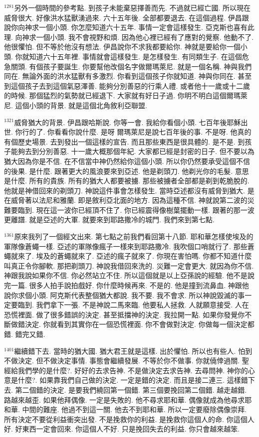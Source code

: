 \documentclass{book}
\begin{document}
$^{1281}$另外一個時間的參考點.
到孩子未能棄惡擇善而先.
不過就已經亡國.
所以現在威脅很大.
好像洪水猛獸湧過來.
六十五年後.
全部都要退去.
在這個過程.
伊昌跟說你向神求一個小頭.
你怎麼知道六十五年.
事情一定會這樣發生.
亞克斯也喜有此理.
向神求一個小頭.
我不會視野和煩.
因為他心裡已經有了應對的覺察.
他動不了.
他很懼怕.
但不等於他沒有想法.
伊昌說你不求我都要給你.
神就是要給你一個小頭.
你就知道六十五年裡.
事情就會這樣發生.
是怎樣發生.
有同類生子.
在這個危急關頭.
有個孩子要誕生.
你要幫他改個名字做爾瑪萊尼.
就是一個名稱.
神與我們同在.
無論外面的洪水猛獸有多激烈.
你看到這個孩子你就知道.
神與你同在.
甚至到這個孩子去到這個氣惡澤善.
能夠分別善惡的行乘人禮.
或者他十一歲或十二歲的時候.
那個猛烈的氣勢就已經退下.
大家就有好日子過.
你明不明白這個爾瑪萊尼.
這個小頭的背景.
就是這個北角敘利亞聯盟.

$^{1321}$威脅猶大的背景.
伊昌跟哈斯說.
你等一會.
我給你看個小頭.
七百年後耶穌出世.
你行的了.
你看看你說什麼.
是呀 爾瑪萊尼是說七百年後的事.
不是呀.
他真的有個歷史場景.
去到發出一個這樣的宣告.
而且那些東西是很具體的.
是不是.
到孩子能夠去到分別善惡.
十一歲大概那個年紀.
大家都已經是封密的日子.
但不要以為猶大因為你是不信.
在不信當中神仍然給你這個小頭.
所以你仍然要承受這個不信的後果.
是什麼.
跟著更大的風浪要來到亞述.
他是剃頭刀.
他剃光你的毛髮.
意思是什麼.
所有的貴族.
所有的猶大人都要被擄.
那些被擄者全部都是剃到乾脆脫的.
他就是神借回來的剃頭刀.
神說這件事會怎樣發生.
當時亞述都沒有威脅到猶大.
是在威脅著以法尼和雅蘭.
即是敘利亞北面的地方.
因為這種不信.
神就說第二波的災難要臨到.
現在這一波你已經頂不住了.
你已經震得像樹葉擺動一樣.
跟著的那一波更離譜.
就是亞述的大軍.
就要來到耶路撒冷的城門.
我們來到第七點.

$^{1361}$原來我列了一個經文出來.
第七點之前我們看回第十八節.
耶和華怎樣使埃及的軍隊像蒼蠅一樣.
亞述的軍隊像瘋子一樣來到耶路撒冷.
我吹個口哨就行了.
那些蒼蠅就來了.
埃及的蒼蠅就來了.
亞述的瘋子就來了.
你現在害怕嗎.
你都不知道什麼叫真正令你腳軟.
那把剃頭刀.
神說我借回來洗的.
災難一定會更大.
就因為你不信.
神跟我說如果你不信.
你必然站立不住.
所以這個就是以上亞孫說的經驗.
他不是說完一篇.
很多人拍手說拍戲好.
你什麼時候再來.
不是的.
他是撞到流鼻血.
神跟他說你求個小頭.
阿克斯代表整個猶大都說.
我不要.
我不會求.
所以神說毀滅的事一定要臨到.
我們拿下一張.
不是神說二馬來臨.
他要私人拯救.
人就願意接受.
人在恐慌裡面.
做了很多錯誤的決定.
甚至抵擋神的決定.
我拉開一點.
如果你發覺你不斷做錯決定.
你就看到其實你在一個恐慌裡面.
你不會做對決定.
你做每一個決定都錯.
錯完又錯.

$^{1401}$繼續錯下去.
當時的猶大國.
猶大君王就是這樣.
出於懼怕.
所以也有些人.
怕到不做決定.
但不做決定事情.
事態會繼續發展.
不等於你不做事.
你就僥倖過關.
聖經給我們學的是什麼?.
好好的去求告神.
不是做決定去求告神.
去尋問神.
神你的心意是什麼?.
如果靠我們自己做的決定.
一定是錯的決定.
而且是接二連三.
這樣錯下去.
第二個錯的決定.
是要我們繞回第一個錯.
第三個要挽回第二個錯.
越走越錯.
路越來越歪.
如果他拜偶像.
一定是失敗的.
他不尋求耶和華.
偶像就成為他尋求耶和華.
中間的難座.
他過不到這一關.
他去不到耶和華.
所以一定要廢除偶像崇拜.
所有決定不要從利益衝突出發.
不是挽救你的利益.
是挽救你這個人的命.
你這個人好.
好東西一定會回來.
你這個人不好.
只是挽回失去的利益.
你只會越來越笨.
\end{document}
